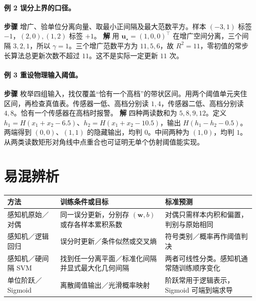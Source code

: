 \documentclass[UTF8,a4paper,zihao=-4,fontset=fandol]{ctexrep}
\begin{document}
\paragraph{例 2 误分上界的口径。}
\textbf{步骤} 增广、验单位分离向量、取最小正间隔及最大范数平方。样本 \((-3,1)\) 标签 \(-1\)，\((2,0),(1,2)\) 标签 \(+1\)。
\textbf{解} 用 \(\bm u_\star=(1,0,0)^\top\) 在增广空间分离，三个间隔 \(3,2,1\)，所以 \(\gamma=1\)。三个增广范数平方为 \(11,5,6\)，故 \(R^2=11\)，零初值的常步长算法总更新次数不超过 \(11\)。这不是实际一定更新 \(11\) 次。

\paragraph{例 3 重设物理输入阈值。}
\textbf{步骤} 枚举四组输入，找仅覆盖“恰有一个高档”的带状区间。用两个阈值单元夹住区间，再检查真值表。传感器一低、高档分别读 \(1,4\)，传感器二低、高档分别读 \(4,8\)。恰有一个传感器在高档时报警。
\textbf{解} 四种两读数和为 \(5,8,9,12\)。定义 \(h_1=H(x_1+x_2-6.5)\)、\(h_2=H(x_1+x_2-10.5)\)，输出 \(H(h_1-h_2-0.5)\)。两端得到 \((0,0)\)、\((1,1)\) 的隐藏输出，均判 \(0\)。中间两种为 \((1,0)\)，均判 \(1\)。从两类读数矩形对角线中点重合也可证明无单个仿射阈值能实现。

\section{易混辨析}
\noindent\begin{tabularx}{\linewidth}{@{}p{.25\linewidth}XX@{}}
\toprule
方法 & 训练条件或目标 & 标准预测\\
\midrule
感知机原始／对偶 & 同一误分更新，分别存 \((\bm w,b)\) 或存各样本累积系数 & 对偶只需样本内积和偏置，判别与原始相同\\
感知机／逻辑回归 & 误分时更新／条件似然或交叉熵 & 符号类别／概率再作阈值判决\\
感知机／硬间隔 SVM & 找到任一分离平面／标准化间隔并显式最大化几何间隔 & 两者可线性分类。感知机通常随训练顺序变化\\
单位阶跃／Sigmoid & 离散阈值输出／光滑概率映射 & 阶跃常用于逻辑表示，Sigmoid 可端到端求导\\
\bottomrule
\end{tabularx}
\end{document}
